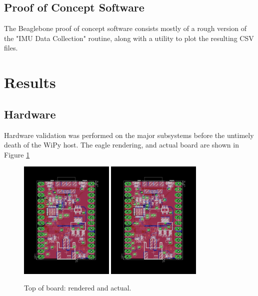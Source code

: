\documentclass[11pt,oneside]{amsart}
\begin{document}
\subsection{Proof of Concept Software}
The Beaglebone proof of concept software consists mostly of a rough version of the "IMU Data Collection" routine, along with a utility to plot the resulting CSV files. 

\section{Results}
\subsection{Hardware}
Hardware validation was performed on the major subsystems before the untimely death of the WiPy host. The eagle rendering, and actual board are shown in Figure \ref{fig:board}
\begin{figure}[htbp]
\begin{center}
\includegraphics[width=0.4\textwidth]{figures/board.png}
\includegraphics[width=0.4\textwidth]{figures/board.png}
\caption{Top of board: rendered and actual.}
\label{fig:board}
\end{center}
\end{figure}
\end{document}

